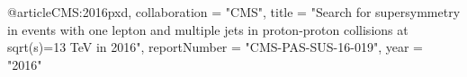@article{CMS:2016pxd,
    collaboration = "CMS",
    title = "{Search for supersymmetry in events with one lepton and multiple jets in proton-proton collisions at sqrt(s)=13 TeV in 2016}",
    reportNumber = "CMS-PAS-SUS-16-019",
    year = "2016"
}

